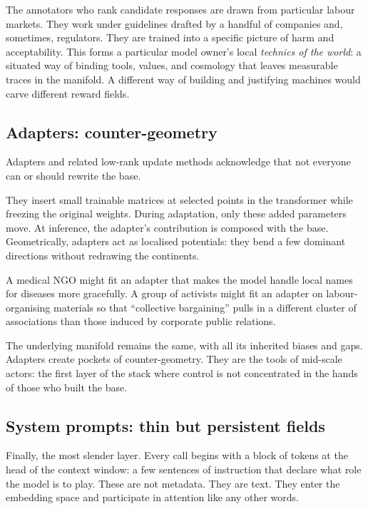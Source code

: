 The annotators who rank candidate responses are drawn from particular labour markets. They work under guidelines drafted by a handful of companies and, sometimes, regulators. They are trained into a specific picture of harm and acceptability. This forms a particular model owner's local \emph{technics of the world}: a situated way of binding tools, values, and cosmology that leaves measurable traces in the manifold. A different way of building and justifying machines would carve different reward fields.

\subsection{Adapters: counter-geometry}

Adapters and related low-rank update methods acknowledge that not everyone can or should rewrite the base.

They insert small trainable matrices at selected points in the transformer while freezing the original weights. During adaptation, only these added parameters move. At inference, the adapter's contribution is composed with the base. Geometrically, adapters act as localised potentials: they bend a few dominant directions without redrawing the continents.

A medical NGO might fit an adapter that makes the model handle local names for diseases more gracefully. A group of activists might fit an adapter on labour-organising materials so that ``collective bargaining'' pulls in a different cluster of associations than those induced by corporate public relations.

The underlying manifold remains the same, with all its inherited biases and gaps. Adapters create pockets of counter-geometry. They are the tools of mid-scale actors: the first layer of the stack where control is not concentrated in the hands of those who built the base.

\subsection{System prompts: thin but persistent fields}

Finally, the most slender layer. Every call begins with a block of tokens at the head of the context window: a few sentences of instruction that declare what role the model is to play. These are not metadata. They are text. They enter the embedding space and participate in attention like any other words.


